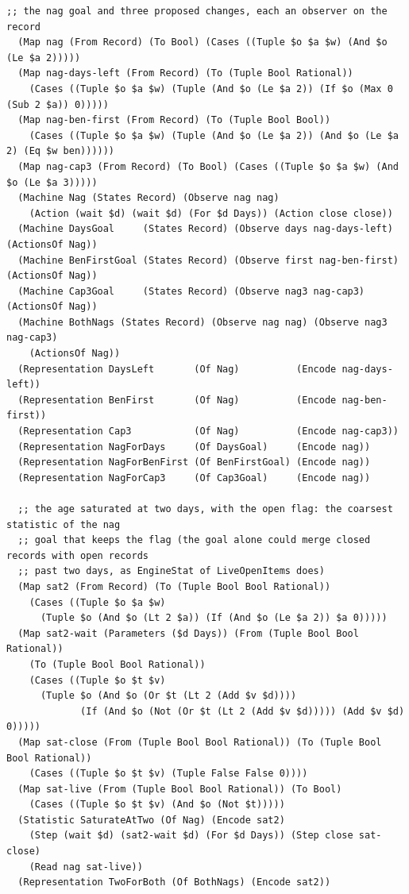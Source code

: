 \documentclass[11pt]{article}
\theoremstyle{definition}
\theoremstyle{plain}
\begin{document}
\begin{lstlisting}[style=mettafull]
  ;; the nag goal and three proposed changes, each an observer on the record
  (Map nag (From Record) (To Bool) (Cases ((Tuple $o $a $w) (And $o (Le $a 2)))))
  (Map nag-days-left (From Record) (To (Tuple Bool Rational))
    (Cases ((Tuple $o $a $w) (Tuple (And $o (Le $a 2)) (If $o (Max 0 (Sub 2 $a)) 0)))))
  (Map nag-ben-first (From Record) (To (Tuple Bool Bool))
    (Cases ((Tuple $o $a $w) (Tuple (And $o (Le $a 2)) (And $o (Le $a 2) (Eq $w ben))))))
  (Map nag-cap3 (From Record) (To Bool) (Cases ((Tuple $o $a $w) (And $o (Le $a 3)))))
  (Machine Nag (States Record) (Observe nag nag)
    (Action (wait $d) (wait $d) (For $d Days)) (Action close close))
  (Machine DaysGoal     (States Record) (Observe days nag-days-left) (ActionsOf Nag))
  (Machine BenFirstGoal (States Record) (Observe first nag-ben-first) (ActionsOf Nag))
  (Machine Cap3Goal     (States Record) (Observe nag3 nag-cap3)       (ActionsOf Nag))
  (Machine BothNags (States Record) (Observe nag nag) (Observe nag3 nag-cap3)
    (ActionsOf Nag))
  (Representation DaysLeft       (Of Nag)          (Encode nag-days-left))
  (Representation BenFirst       (Of Nag)          (Encode nag-ben-first))
  (Representation Cap3           (Of Nag)          (Encode nag-cap3))
  (Representation NagForDays     (Of DaysGoal)     (Encode nag))
  (Representation NagForBenFirst (Of BenFirstGoal) (Encode nag))
  (Representation NagForCap3     (Of Cap3Goal)     (Encode nag))

  ;; the age saturated at two days, with the open flag: the coarsest statistic of the nag
  ;; goal that keeps the flag (the goal alone could merge closed records with open records
  ;; past two days, as EngineStat of LiveOpenItems does)
  (Map sat2 (From Record) (To (Tuple Bool Bool Rational))
    (Cases ((Tuple $o $a $w)
      (Tuple $o (And $o (Lt 2 $a)) (If (And $o (Le $a 2)) $a 0)))))
  (Map sat2-wait (Parameters ($d Days)) (From (Tuple Bool Bool Rational))
    (To (Tuple Bool Bool Rational))
    (Cases ((Tuple $o $t $v)
      (Tuple $o (And $o (Or $t (Lt 2 (Add $v $d))))
             (If (And $o (Not (Or $t (Lt 2 (Add $v $d))))) (Add $v $d) 0)))))
  (Map sat-close (From (Tuple Bool Bool Rational)) (To (Tuple Bool Bool Rational))
    (Cases ((Tuple $o $t $v) (Tuple False False 0))))
  (Map sat-live (From (Tuple Bool Bool Rational)) (To Bool)
    (Cases ((Tuple $o $t $v) (And $o (Not $t)))))
  (Statistic SaturateAtTwo (Of Nag) (Encode sat2)
    (Step (wait $d) (sat2-wait $d) (For $d Days)) (Step close sat-close)
    (Read nag sat-live))
  (Representation TwoForBoth (Of BothNags) (Encode sat2))


\end{lstlisting}
\end{document}
